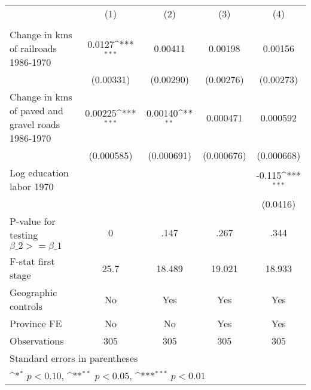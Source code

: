 {
\def\sym#1{\ifmmode^{#1}\else\(^{#1}\)\fi}
\begin{tabular}{l*{4}{c}}
\hline\hline
                &\multicolumn{1}{c}{(1)}&\multicolumn{1}{c}{(2)}&\multicolumn{1}{c}{(3)}&\multicolumn{1}{c}{(4)}\\
                &\multicolumn{1}{c}{}&\multicolumn{1}{c}{}&\multicolumn{1}{c}{}&\multicolumn{1}{c}{}\\
\hline
Change in kms of railroads 1986-1970&   0.0127\sym{***}&  0.00411         &  0.00198         &  0.00156         \\
                &(0.00331)         &(0.00290)         &(0.00276)         &(0.00273)         \\
[1em]
Change in kms of paved and gravel roads 1986-1970&  0.00225\sym{***}&  0.00140\sym{**} & 0.000471         & 0.000592         \\
                &(0.000585)         &(0.000691)         &(0.000676)         &(0.000668)         \\
[1em]
Log education labor 1970&                  &                  &                  &   -0.115\sym{***}\\
                &                  &                  &                  & (0.0416)         \\
\hline
P-value for testing $\beta\_{2} >= \beta\_{1}$&        0         &     .147         &     .267         &     .344         \\
F-stat first stage&     25.7         &   18.489         &   19.021         &   18.933         \\
Geographic controls&       No         &      Yes         &      Yes         &      Yes         \\
Province FE     &       No         &       No         &      Yes         &      Yes         \\
Observations    &      305         &      305         &      305         &      305         \\
\hline\hline
\multicolumn{5}{l}{\footnotesize Standard errors in parentheses}\\
\multicolumn{5}{l}{\footnotesize \sym{*} \(p<0.10\), \sym{**} \(p<0.05\), \sym{***} \(p<0.01\)}\\
\end{tabular}
}
